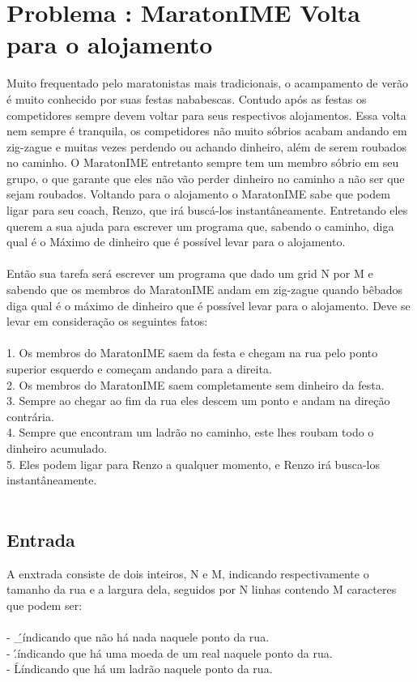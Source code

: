 \section*{Problema \proxLetra: MaratonIME Volta para o alojamento}

Muito frequentado pelo maratonistas mais tradicionais, o acampamento de verão é muito conhecido por suas festas nababescas. Contudo após as festas os competidores sempre devem voltar para seus respectivos alojamentos. Essa volta nem sempre é tranquila, os competidores não muito sóbrios acabam andando em zig-zague e muitas vezes perdendo ou achando dinheiro, além de serem roubados no caminho. O MaratonIME entretanto sempre tem um membro sóbrio em seu grupo, o que garante que eles não vão perder dinheiro no caminho a não ser que sejam roubados. Voltando para o alojamento o MaratonIME sabe que podem ligar para seu coach, Renzo, que irá buscá-los instantâneamente. Entretando eles querem a sua ajuda para escrever um programa que, sabendo o caminho, diga qual é o Máximo de dinheiro que é possível levar para o alojamento.\\
\\
Então sua tarefa será escrever um programa que dado um grid N por M e sabendo que os membros do MaratonIME andam em zig-zague quando bêbados diga qual é o máximo de dinheiro que é possível levar para o alojamento. Deve se levar em consideração os seguintes fatos:\\
\\
1. Os membros do MaratonIME saem da festa e chegam na rua pelo ponto superior esquerdo e começam andando para a direita.\\
2. Os membros do MaratonIME saem completamente sem dinheiro da festa.\\
3. Sempre ao chegar ao fim da rua eles descem um ponto e andam na direção contrária.\\
4. Sempre que encontram um ladrão no caminho, este lhes roubam todo o dinheiro acumulado.\\
5. Eles podem ligar para Renzo a qualquer momento, e Renzo irá busca-los instantâneamente.\\
\\
\subsection*{Entrada}
\textoDiversasInstanciasEOF

A enxtrada consiste de dois inteiros, N e M, indicando respectivamente o tamanho da rua e a largura dela, seguidos por N linhas contendo M caracteres que podem ser:\\
\\
- \'\_\'  indicando que não há nada naquele ponto da rua.\\
- \'.\'  indicando que há uma moeda de um real naquele ponto da rua.\\
- \'L\'  indicando que há um ladrão naquele ponto da rua.\\

